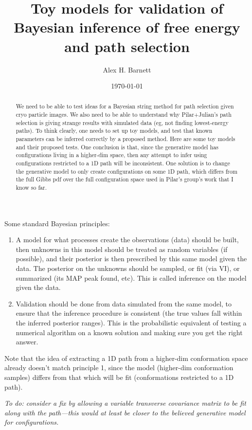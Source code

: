\documentclass[10pt]{article}
\newcommand{\ben}{\begin{enumerate}}
\newcommand{\een}{\end{enumerate}}
\begin{document}
\title{Toy models for validation of Bayesian inference of free energy and path selection}

\author{Alex H. Barnett}
\date{\today}
\maketitle

\begin{abstract}
  We need to be able to test ideas for a Bayesian string method for path selection given cryo particle images.
  We also need to be able to understand why Pilar+Julian's path selection is giving strange results with simulated data (eg, not finding lowest-energy paths).
  To think clearly, one needs to set up toy models, and test that known
  parameters can be inferred correctly by a proposed method.
  Here are some toy models and their proposed tests.
  One conclusion is that, since the generative model has configurations living
  in a higher-dim space, then any attempt to infer using configurations
  restricted to a 1D path will be inconsistent.
  One solution is to change the generative model to only create configurations
  on some 1D path, which differs from the full Gibbs pdf over the full
  configuration space used in Pilar's group's work that I know so far.
\end{abstract}

Some standard Bayesian principles:
\ben
\item
A model for what processes create the observations (data)
should be built, then unknowns in this model should be treated as
random variables (if possible), and their posterior is then
prescribed by this same model given the data. The posterior on the unknowns
should be sampled, or fit (via VI), or summarized (its MAP peak found, etc).
This is called inference on the model given the data.
\item
Validation should be done from data simulated from the same model,
to ensure that the inference procedure is consistent (the true values
fall within the inferred posterior ranges). This is the
probabilistic
equivalent of testing a numerical algorithm on a known solution and
making sure you get the right answer.
\een

Note that the idea of extracting a 1D path from a higher-dim conformation
space
already doesn't match principle 1, since the model (higher-dim conformation samples)
differs from that which will be fit (conformations restricted to a 1D path).

{\em To do: consider a fix by allowing a variable transverse covariance matrix to
be fit along with the path---this would at least be closer to the believed generative model for configurations.}
\end{document}
